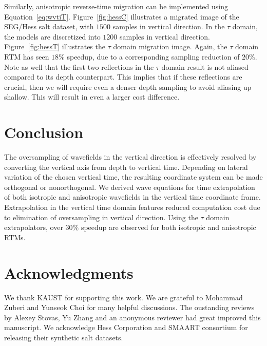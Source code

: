 
Similarly, anisotropic reverse-time migration can be implemented using Equation~\ref{eq:wvtiT}. 
Figure~\ref{fig:hessC} illustrates a migrated image of the SEG/Hess salt dataset, with $1500$ samples in vertical direction. In the $\tau$ domain, the models are discretized into $1200$ samples in vertical direction. 
Figure~\ref{fig:hessT} illustrates the $\tau$ domain migration image. Again, the $\tau$ domain RTM has seen $18\%$ speedup, due to a corresponding sampling reduction of $20\%$. Note as well that the first two reflections in the $\tau$
domain result is not aliased compared to its depth counterpart. This implies that if these reflections are crucial, then we will require even a denser depth sampling to avoid aliasing
up shallow. This will result in even a larger cost difference.



\section{Conclusion}

The oversampling of wavefields in the vertical direction is effectively resolved by converting the vertical axis from depth to vertical time. 
Depending on lateral variation of the chosen vertical time, the resulting coordinate system can be made orthogonal or nonorthogonal. 
We derived wave equations for time extrapolation of both isotropic and anisotropic wavefields in the vertical time coordinate frame. 
Extrapolation in the vertical time domain features reduced computation cost due to elimination of oversampling in vertical direction.
Using the $\tau$ domain extrapolators, over $30\%$ speedup are observed for both isotropic and anisotropic RTMs.

\section{Acknowledgments}
We thank KAUST for supporting this work. 
We are grateful to Mohammad Zuberi and Yunseok Choi for many helpful discussions.
The oustanding reviews by Alexey Stovas, Yu Zhang and an anonymous reviewer had great improved this manuscript.
We acknowledge Hess Corporation and SMAART consortium for releasing their synthetic salt datasets. 

